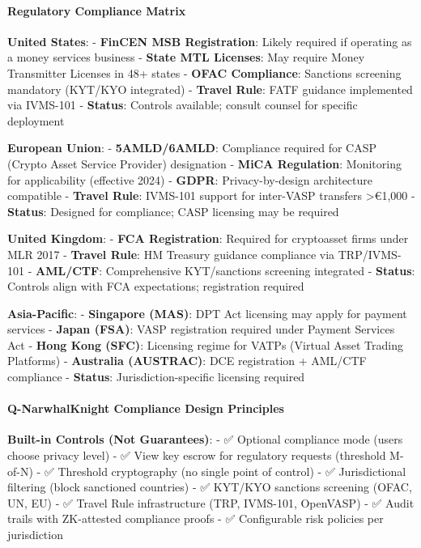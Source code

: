 \documentclass[
  11pt,
]{article}
\begin{document}
\hypertarget{regulatory-compliance-matrix}{%
\paragraph{Regulatory Compliance
Matrix}\label{regulatory-compliance-matrix}}

\textbf{United States}: - \textbf{FinCEN MSB Registration}: Likely
required if operating as a money services business - \textbf{State MTL
Licenses}: May require Money Transmitter Licenses in 48+ states -
\textbf{OFAC Compliance}: Sanctions screening mandatory (KYT/KYO
integrated) - \textbf{Travel Rule}: FATF guidance implemented via
IVMS-101 - \textbf{Status}: Controls available; consult counsel for
specific deployment

\textbf{European Union}: - \textbf{5AMLD/6AMLD}: Compliance required for
CASP (Crypto Asset Service Provider) designation - \textbf{MiCA
Regulation}: Monitoring for applicability (effective 2024) -
\textbf{GDPR}: Privacy-by-design architecture compatible -
\textbf{Travel Rule}: IVMS-101 support for inter-VASP transfers
\textgreater€1,000 - \textbf{Status}: Designed for compliance; CASP
licensing may be required

\textbf{United Kingdom}: - \textbf{FCA Registration}: Required for
cryptoasset firms under MLR 2017 - \textbf{Travel Rule}: HM Treasury
guidance compliance via TRP/IVMS-101 - \textbf{AML/CTF}: Comprehensive
KYT/sanctions screening integrated - \textbf{Status}: Controls align
with FCA expectations; registration required

\textbf{Asia-Pacific}: - \textbf{Singapore (MAS)}: DPT Act licensing may
apply for payment services - \textbf{Japan (FSA)}: VASP registration
required under Payment Services Act - \textbf{Hong Kong (SFC)}:
Licensing regime for VATPs (Virtual Asset Trading Platforms) -
\textbf{Australia (AUSTRAC)}: DCE registration + AML/CTF compliance -
\textbf{Status}: Jurisdiction-specific licensing required

\hypertarget{q-narwhalknight-compliance-design-principles}{%
\paragraph{Q-NarwhalKnight Compliance Design
Principles}\label{q-narwhalknight-compliance-design-principles}}

\textbf{Built-in Controls (Not Guarantees)}: - ✅ Optional compliance
mode (users choose privacy level) - ✅ View key escrow for regulatory
requests (threshold M-of-N) - ✅ Threshold cryptography (no single point
of control) - ✅ Jurisdictional filtering (block sanctioned countries) -
✅ KYT/KYO sanctions screening (OFAC, UN, EU) - ✅ Travel Rule
infrastructure (TRP, IVMS-101, OpenVASP) - ✅ Audit trails with
ZK-attested compliance proofs - ✅ Configurable risk policies per
jurisdiction
\end{document}
